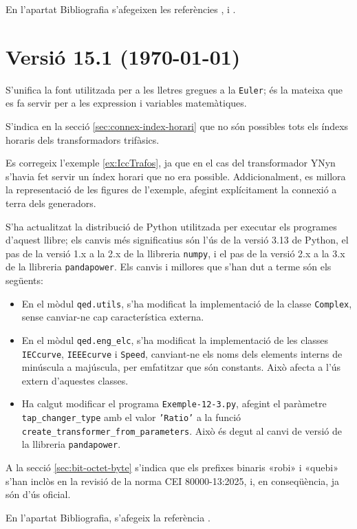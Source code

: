 En l'apartat Bibliografia s'afegeixen les referències \cite{KRE}, \cite{SAL}  i \cite{MGIO}.


\section*{Versió 15.1 (\today)}

S'unifica la font utilitzada per a les lletres gregues a la \texttt{Euler}; és la mateixa  que es fa servir per a les expression i variables matemàtiques.

S'indica en la secció \ref{sec:connex-index-horari} que no són possibles tots els índexs horaris dels transformadors trifàsics.

Es corregeix l'exemple \ref{ex:IccTrafos}, ja que en el cas del transformador YNyn s'havia fet servir un índex horari que no era possible. Addicionalment, es millora la representació de les figures de l'exemple, afegint explícitament la connexió a terra dels generadors.

S'ha actualitzat la distribució de Python utilitzada per executar els programes d'aquest llibre; els canvis més significatius són l'ús de la versió 3.13 de Python, el pas de la versió 1.x a la 2.x de la llibreria \texttt{numpy}, i el pas de la versió 2.x a la 3.x de la llibreria \texttt{pandapower}. Els canvis i millores que s'han dut a terme són els següents:
\begin{itemize}
    \item En el mòdul \texttt{qed.utils}, s'ha modificat la implementació  de la classe \texttt{Complex}, sense canviar-ne cap característica externa.
    \item En el mòdul \texttt{qed.eng\_elc}, s'ha modificat la implementació  de les classes \texttt{IECcurve}, \texttt{IEEEcurve} i \texttt{Speed}, canviant-ne els noms dels elements interns de minúscula a majúscula, per emfatitzar que són constants. Això afecta a l'ús extern d'aquestes classes.
    \item Ha calgut modificar el programa \texttt{Exemple-12-3.py}, afegint el paràmetre \texttt{tap\_changer\_type} amb el valor \texttt{'Ratio'} a la funció \texttt{create\_transformer\_from\_parameters}. Això és degut al canvi de versió de la llibreria \texttt{pandapower}.
\end{itemize}

A la secció \ref{sec:bit-octet-byte} s'indica que els prefixes binaris «robi» i «quebi»  s'han inclòs en la revisió de la norma CEI 80000-13:2025, i, en conseqüència,  ja són d'ús oficial.

En l'apartat Bibliografia, s'afegeix la referència \cite{SSMH}.
